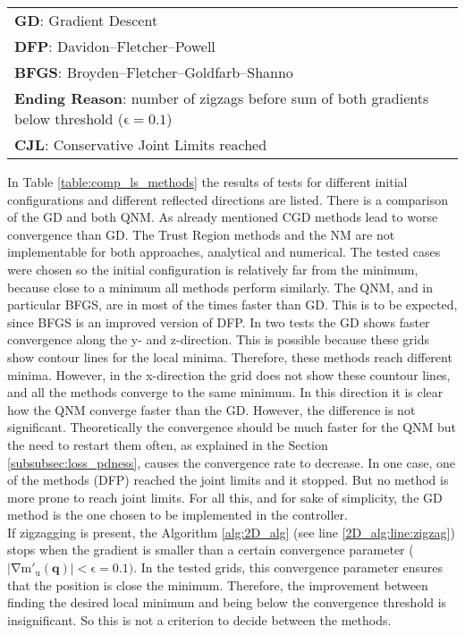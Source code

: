 \begin{table}[!h]
{\begin{tabular}{@{}|c|c|c|c|c|c|c|c|@{}}
			\multicolumn{8}{l}{\textbf{GD}: Gradient Descent}\\
			\multicolumn{8}{l}{\textbf{DFP}: Davidon–Fletcher–Powell}\\
			\multicolumn{8}{l}{\textbf{BFGS}: Broyden–Fletcher–Goldfarb–Shanno}\\
			\multicolumn{8}{l}{\textbf{Ending Reason}: number of zigzags before sum of both gradients below threshold ($\mathrm{\epsilon=0.1}$)}\\
			\multicolumn{8}{l}{\textbf{CJL}: Conservative Joint Limits reached}\\
		\end{tabular}
	}
\end{table}


In Table \ref{table:comp_ls_methods} the results of tests for different initial configurations and different reflected directions are listed. There is a comparison of the GD and both QNM. As already mentioned CGD methods lead to worse convergence than GD. The Trust Region methods and the NM are not implementable for both approaches, analytical and numerical.
The tested cases were chosen so the initial configuration is relatively far from the minimum, because close to a minimum all methods perform similarly.
The QNM, and in particular BFGS, are in most of the times faster than GD. This is to be expected, since BFGS is an improved version of DFP.  In two tests  the GD shows faster convergence along the y- and z-direction. This is possible  because these grids show contour lines for the local minima. Therefore, these methods reach different minima. However, in the x-direction the grid does not show these countour lines, and all the methods converge to the same minimum. In this direction it is clear how the QNM converge faster than the GD.
 However, the difference is not significant. Theoretically the convergence should be much faster for the QNM but the need to restart them often, as explained in the Section \ref{subsubsec:loss_pdness}, causes the convergence rate to decrease. 
In one case, one of the methods (DFP) reached the joint limits and it stopped. But no method is more prone to reach joint limits. For all this, and for sake of simplicity, the GD method is the one chosen to be implemented in the controller.\\
If zigzagging is present, the Algorithm \ref{alg:2D_alg} (see line \ref{2D_alg:line:zigzag}) stops when the gradient is smaller than a certain convergence parameter ($\mathrm{|\nabla m'_u(\mathbf{q})| < \epsilon=0.1 )}$.
In the tested grids, this convergence parameter ensures that the position is close the minimum. Therefore, the improvement between finding the desired local minimum and being below the convergence threshold is insignificant. So this is not a criterion to decide between the methods.
